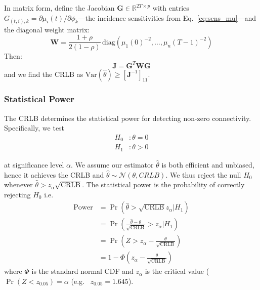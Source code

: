 In matrix form, define the Jacobian $\mathbf{G} \in \mathbb{R}^{2T \times p}$
with entries $G_{(t,i),k} = \partial \mu_i(t)/\partial \phi_k$---the
incidence sensitivities from Eq.~\eqref{eq:sens_mu}---and the diagonal
weight matrix:
\begin{equation*}
\mathbf{W} = \frac{1+\rho}{2(1-\rho)} \,
\text{diag}\left(\mu_1(0)^{-2}, \ldots, \mu_n(T-1)^{-2}\right)
\end{equation*}
Then:
\begin{equation}\label{eq:fim}
\mathbf{J} = \mathbf{G}^T \mathbf{W} \mathbf{G}
\end{equation}
and we find the CRLB as $\text{Var}(\hat{\theta}) \geq
[\mathbf{J}^{-1}]_{11}$.

\subsubsection*{Statistical Power}

The CRLB determines the statistical power for detecting non-zero
connectivity. Specifically, we test
\begin{align*}
  H_0&: \theta = 0\\
  H_1&: \theta > 0
\end{align*}

at significance level $\alpha$. We assume our estimator $\hat{\theta}$
is both efficient and unbiased, hence it achieves the CRLB and
$\hat{\theta} \sim \mathcal{N}(\theta, CRLB)$. We thus reject the null
$H_0$ whenever $\hat{\theta} > z_\alpha\sqrt{\text{CRLB}}$. The
statistical power is the probability of correctly rejecting $H_0$ i.e.
\begin{align*}%
  \text{Power} &= \Pr(\hat{\theta} > \sqrt{\text{CRLB}} z_\alpha|H_1) \\
  &= \Pr(\frac{\hat{\theta} - \theta}{\sqrt{\text{CRLB}}} > z_\alpha|H_1) \\
  &= \Pr(Z > z_\alpha - \frac{\theta}{\sqrt{\text{CRLB}}}) \\
  &= 1 - \Phi\left(z_\alpha -
  \frac{\theta}{\sqrt{\text{CRLB}}}\right)
\end{align*}
where $\Phi$ is the standard normal CDF and $z_\alpha$ is the critical
value ($\Pr(Z < z_{0.05}) = \alpha$ (e.g.~ $z_{0.05}= 1.645$).


